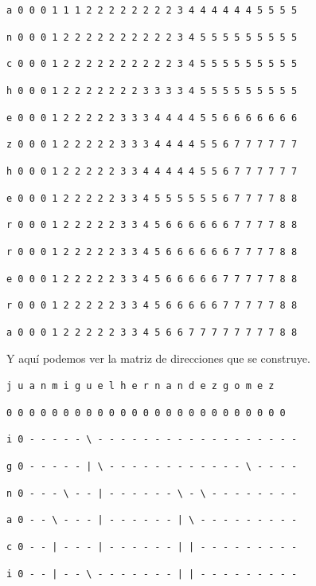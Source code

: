 \documentclass[11pt,a4paper]{article} %
\begin{document}
\texttt{a 0 0 0 1 1 1 2 2 2 2 2 2 2 2 3 4 4 4 4 4 4 5 5 5 5}

\texttt{n 0 0 0 1 2 2 2 2 2 2 2 2 2 2 3 4 5 5 5 5 5 5 5 5 5}

\texttt{c 0 0 0 1 2 2 2 2 2 2 2 2 2 2 3 4 5 5 5 5 5 5 5 5 5}

\texttt{h 0 0 0 1 2 2 2 2 2 2 2 3 3 3 3 4 5 5 5 5 5 5 5 5 5}

\texttt{e 0 0 0 1 2 2 2 2 2 3 3 3 4 4 4 4 5 5 6 6 6 6 6 6 6}

\texttt{z 0 0 0 1 2 2 2 2 2 3 3 3 4 4 4 4 5 5 6 7 7 7 7 7 7}

\texttt{h 0 0 0 1 2 2 2 2 2 3 3 4 4 4 4 4 5 5 6 7 7 7 7 7 7}

\texttt{e 0 0 0 1 2 2 2 2 2 3 3 4 5 5 5 5 5 5 6 7 7 7 7 8 8}

\texttt{r 0 0 0 1 2 2 2 2 2 3 3 4 5 6 6 6 6 6 6 7 7 7 7 8 8}

\texttt{r 0 0 0 1 2 2 2 2 2 3 3 4 5 6 6 6 6 6 6 7 7 7 7 8 8}

\texttt{e 0 0 0 1 2 2 2 2 2 3 3 4 5 6 6 6 6 6 7 7 7 7 7 8 8}

\texttt{r 0 0 0 1 2 2 2 2 2 3 3 4 5 6 6 6 6 6 7 7 7 7 7 8 8}

\texttt{a 0 0 0 1 2 2 2 2 2 3 3 4 5 6 6 7 7 7 7 7 7 7 7 8 8}\\

\normalsize


Y aquí podemos ver la matriz de direcciones que se construye.\\

\small

\hspace{1,72 em} \texttt{j u a n m i g u e l h e r n a n d e z g o m e z}

\hspace{0,71 em} \texttt{0 0 0 0 0 0 0 0 0 0 0 0 0 0 0 0 0 0 0 0 0 0 0 0 0}

\texttt{i 0 - - - - - \textbackslash{ }- - - - - - - - - - - - - - - - - -}

\texttt{g 0 - - - - - | \textbackslash{ }- - - - - - - - - - - - \textbackslash{ }- - - -}

\texttt{n 0 - - - \textbackslash{ }- - | - - - - - - \textbackslash{ }- \textbackslash{ }- - - - - - - -}

\texttt{a 0 - - \textbackslash{ }- - - | - - - - - - | \textbackslash{ }- - - - - - - - -}

\texttt{c 0 - - | - - - | - - - - - - | | - - - - - - - - -}

\texttt{i 0 - - | - - \textbackslash{ }- - - - - - - | | - - - - - - - - -}
\end{document}
